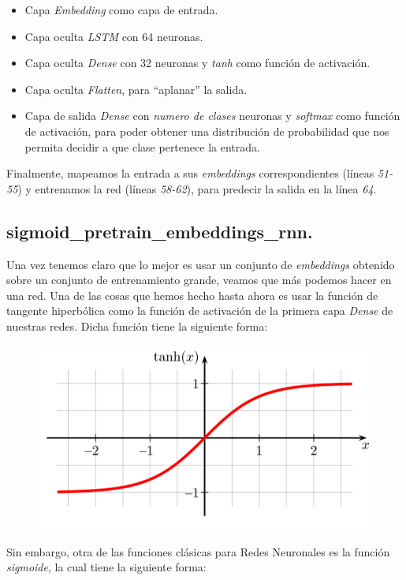 \documentclass[11pt]{article}
\begin{document}
\begin{itemize}
    \item Capa \textit{Embedding} como capa de entrada.
    \item Capa oculta \textit{LSTM} con 64 neuronas.
    \item Capa oculta \textit{Dense} con 32 neuronas y \textit{tanh} como función de activación.
    \item Capa oculta \textit{Flatten}, para ``aplanar'' la salida.
    \item Capa de salida \textit{Dense} con \textit{numero de clases} neuronas y \textit{softmax} como función de activación, para poder obtener una distribución de probabilidad que nos permita decidir a que clase pertenece la entrada.
\end{itemize}

Finalmente, mapeamos la entrada a sus \textit{embeddings} correspondientes (líneas \textit{51-55}) y entrenamos la red (líneas \textit{58-62}), para predecir la salida en la línea \textit{64}.



\subsection{sigmoid\_pretrain\_embeddings\_rnn.} \label{sigmoidpretrainembeddingsrnn}

Una vez tenemos claro que lo mejor es usar un conjunto de \textit{embeddings} obtenido sobre un conjunto de entrenamiento grande, veamos que más podemos hacer en una red. Una de las cosas que hemos hecho hasta ahora es usar la función de tangente hiperbólica como la función de activación de la primera capa \textit{Dense} de nuestras redes. Dicha función tiene la siguiente forma:

\begin{figure}[H]
\centering
\includegraphics[width=0.5\linewidth]{images/tanh.png}
\end{figure}

Sin embargo, otra de las funciones clásicas para Redes Neuronales es la función \textit{sigmoide}, la cual tiene la siguiente forma:
\end{document}
